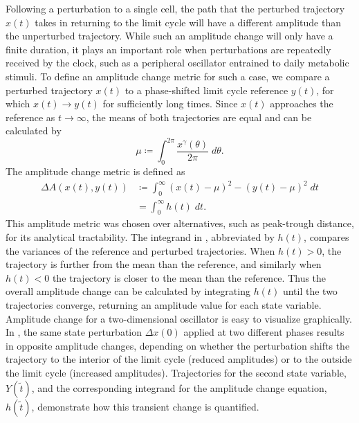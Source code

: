 Following a perturbation to a single cell, the path that the perturbed trajectory $x(t)$ takes in returning to the limit cycle will have a different amplitude than the unperturbed trajectory.
While such an amplitude change will only have a finite duration, it plays an important role when perturbations are repeatedly received by the clock, such as a peripheral oscillator entrained to daily metabolic stimuli.
To define an amplitude change metric for such a case, we compare a perturbed trajectory $x(t)$ to a phase-shifted limit cycle reference $y(t)$, for which $x(t) \to y(t)$ for sufficiently long times.
Since $x(t)$ approaches the reference as $t \to \infty$, the means of both trajectories are equal and can be calculated by
\begin{equation}
  \mu \coloneqq \int_0^{2\pi} \frac{x^\gamma(\theta)}{2\pi} \; d\theta.
  \label{eq:mu}
\end{equation}
The amplitude change metric is defined as
\begin{equation}
  \begin{aligned}
    \Delta A (x(t), y(t)) &\coloneqq \int_0^\infty (x(t) - \mu)^2 - (y(t) - \mu)^2 \; dt\\
    &= \int_0^\infty h(t) \; dt.
  \end{aligned}
  \label{eq:ampchangedefinition}
\end{equation}
This amplitude metric was chosen over alternatives, such as peak-trough distance, for its analytical tractability.
The integrand in , abbreviated by $h(t)$, compares the variances of the reference and perturbed trajectories.
When $h(t) > 0$, the trajectory is further from the mean than the reference, and similarly when $h(t) < 0$ the trajectory is closer to the mean than the reference.
Thus the overall amplitude change can be calculated by integrating $h(t)$ until the two trajectories converge, returning an amplitude value for each state variable.
Amplitude change for a two-dimensional oscillator is easy to visualize graphically.
In , the same state perturbation $\Delta x(0)$ applied at two different phases results in opposite amplitude changes, depending on whether the perturbation shifts the trajectory to the interior of the limit cycle (reduced amplitudes) or to the outside the limit cycle (increased amplitudes).
Trajectories for the second state variable, $Y(\tilde{t})$, and the corresponding integrand for the amplitude change equation, $h(\tilde{t})$, demonstrate how this transient change is quantified.

